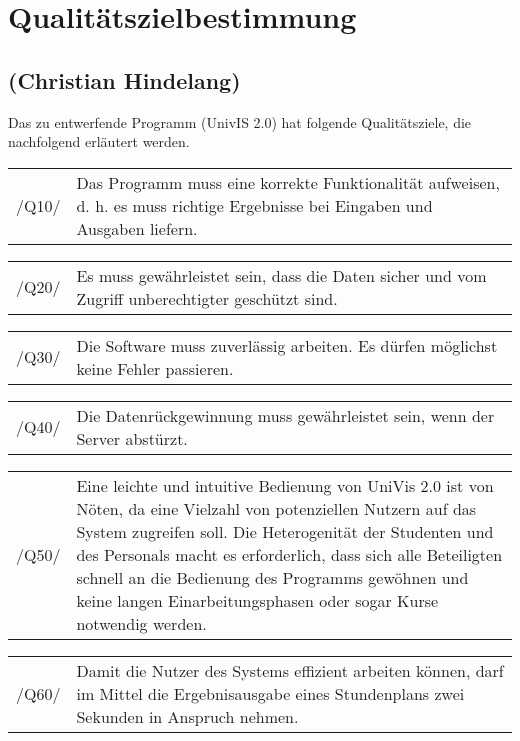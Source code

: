 \section{Qualitätszielbestimmung}
\label{sec:Qualitätszielbestimmung}

\subsection*{(Christian Hindelang)}

Das zu entwerfende Programm (UnivIS 2.0) hat folgende Qualitätsziele, die nachfolgend erläutert werden. 

\begin{tabular}{p{1.5cm}p{14.5cm}}
 /Q10/	& Das Programm muss eine korrekte Funktionalität aufweisen, d. h. es muss richtige Ergebnisse bei Eingaben und Ausgaben liefern. \\[0.25cm]	 
\end{tabular}

\begin{tabular}{p{1.5cm}p{14.5cm}}
 /Q20/	& Es muss gewährleistet sein, dass die Daten sicher und vom Zugriff unberechtigter geschützt sind. \\[0.25cm]	 
\end{tabular}

\begin{tabular}{p{1.5cm}p{14.5cm}}
 /Q30/	& Die Software muss zuverlässig arbeiten. Es dürfen möglichst keine Fehler passieren. \\[0.25cm]	 
\end{tabular}

\begin{tabular}{p{1.5cm}p{14.5cm}}
 /Q40/	& Die Datenrückgewinnung muss gewährleistet sein, wenn der Server abstürzt. \\[0.25cm]	 
\end{tabular}

\begin{tabular}{p{1.5cm}p{14.5cm}}
 /Q50/	& Eine leichte und intuitive Bedienung von UniVis 2.0 ist von Nöten, da eine Vielzahl von potenziellen Nutzern auf das System zugreifen soll. Die Heterogenität der Studenten und des Personals macht es erforderlich, dass sich alle Beteiligten schnell an die Bedienung des Programms gewöhnen und keine langen Einarbeitungsphasen oder sogar Kurse notwendig werden. \\[0.25cm]	 
\end{tabular}

\begin{tabular}{p{1.5cm}p{14.5cm}}
 /Q60/	& Damit die Nutzer des Systems effizient arbeiten können, darf im Mittel die Ergebnisausgabe eines Stundenplans zwei Sekunden in Anspruch nehmen. \\[0.25cm]	 
\end{tabular}

